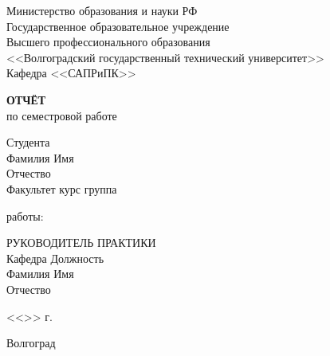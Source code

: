 \documentclass[a4paper, 14pt]{extreport}
\begin{document}
    \begin{titlepage}
        \begin{center}
            Министерство образования и науки РФ \\
            Государственное образовательное учреждение\\
            Высшего профессионального образования\\
            <<Волгоградский государственный технический университет>>\\
            Кафедра <<САПРиПК>>
        \end{center}
        \vspace{2.0cm}
        \begin{center}
            \large \textbf{ОТЧЁТ} \\
            по семестровой работе
        \end{center}
        \begin{flushleft}
            Студента\\
            Фамилия \underline{\hspace{5cm}} 
            Имя \underline{\hspace{5.1cm}}\\
            Отчество \underline{\hspace{5cm}}\\
            Факультет \underline{\hspace{4.8cm}} курс \underline{\hspace{2cm}} 
            группа \underline{\hspace{4cm}}\\
        \end{flushleft}
        \vspace{1.0cm}
         работы: \underline{\hspace{10cm}}
        \vspace{2.0cm}
        \begin{flushleft}
            РУКОВОДИТЕЛЬ ПРАКТИКИ\\
            Кафедра \underline{\hspace{5cm}} Должность \underline{\hspace{5cm}} \\
            Фамилия \underline{\hspace{4.9cm}} Имя \underline{\hspace{6.5cm}}\\
            Отчество \underline{\hspace{4.9cm}}
        \end{flushleft}
        \vspace{1.5cm}
        \begin{flushright}
            <<\underline{\hspace{1.0cm}}>>\underline{\hspace{4.0cm}} \the\year г.
        \end{flushright}
        \vspace{\fill}
        \begin{center}
            Волгоград \the\year
        \end{center}
    \end{titlepage}
    \tableofcontents
    \onehalfspacing
\end{document}
